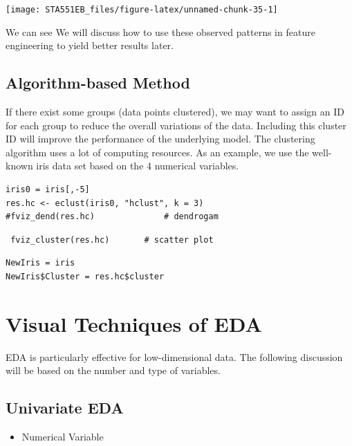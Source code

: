 \documentclass[
]{book}
\providecommand{\tightlist}{%
  \setlength{\itemsep}{0pt}\setlength{\parskip}{0pt}}
\begin{document}
\begin{center}\texttt{[image: STA551EB\_files/figure-latex/unnamed-chunk-35-1]} \end{center}

We can see We will discuss how to use these observed patterns in feature engineering to yield better results later.

\hypertarget{algorithm-based-method}{%
\subsection{Algorithm-based Method}\label{algorithm-based-method}}

If there exist some groups (data points clustered), we may want to assign an ID for each group to reduce the overall variations of the data. Including this cluster ID will improve the performance of the underlying model. The clustering algorithm uses a lot of computing resources. As an example, we use the well-known iris data set based on the 4 numerical variables.

\begin{verbatim}
iris0 = iris[,-5]
res.hc <- eclust(iris0, "hclust", k = 3)
#fviz_dend(res.hc)              # dendrogam
\end{verbatim}

\begin{verbatim}
 fviz_cluster(res.hc)       # scatter plot
\end{verbatim}

\begin{verbatim}
NewIris = iris
NewIris$Cluster = res.hc$cluster
\end{verbatim}

\hypertarget{visual-techniques-of-eda}{%
\section{Visual Techniques of EDA}\label{visual-techniques-of-eda}}

EDA is particularly effective for low-dimensional data. The following discussion will be based on the number and type of variables.

\hypertarget{univariate-eda}{%
\subsection{Univariate EDA}\label{univariate-eda}}

\begin{itemize}
\tightlist
\item
  Numerical Variable
\end{itemize}
\end{document}

